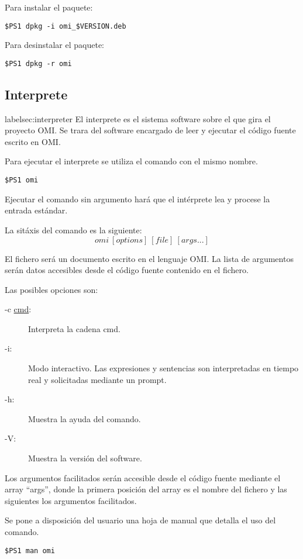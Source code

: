 Para instalar el paquete:
\begin{lstlisting}
$PS1 dpkg -i omi_$VERSION.deb
\end{lstlisting}

Para desinstalar el paquete:
\begin{lstlisting}
$PS1 dpkg -r omi
\end{lstlisting}

\subsection{Interprete}label{sec:interpreter}
El interprete es el sistema software sobre el que gira el proyecto OMI. Se trara
del software encargado de leer y ejecutar el código fuente escrito en OMI.

Para ejecutar el interprete se utiliza el comando con el mismo nombre.
 \begin{lstlisting}
$PS1 omi
\end{lstlisting}

Ejecutar el comando sin argumento hará que el intérprete lea y procese la entrada estándar.

La sitáxis del comando es la siguiente:
$$
omi\ [options]\ [file]\ [args...]
$$

El fichero será un documento escrito en el lenguaje OMI. La lista de argumentos serán datos accesibles
desde el código fuente contenido en el fichero.

Las posibles opciones son:
\begin{description} 
\item [-c \underline{cmd}:] Interpreta la cadena cmd.
\item [-i:] Modo interactivo. Las expresiones y sentencias son interpretadas en tiempo real y solicitadas mediante un prompt.
\item [-h:] Muestra la ayuda del comando.
\item [-V:] Muestra la versión del software.
\end{description}

Los argumentos facilitados serán accesible desde el código fuente mediante el array ``args'', donde la primera posición del array es
el nombre del fichero y las siguientes los argumentos facilitados.

Se pone a disposición del usuario una hoja de manual que detalla el uso del comando.
\begin{lstlisting}
$PS1 man omi
\end{lstlisting}

